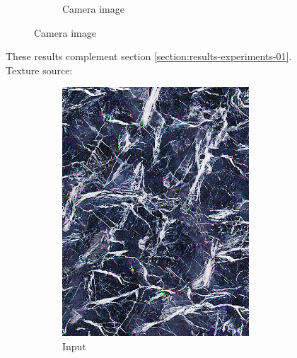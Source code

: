 \begin{figure}[]
\begin{subfigure}{\textwidth}
\begin{subfigure}{0.24\textwidth}
            \caption*{Camera image}
        \end{subfigure}
    \end{subfigure}
    \caption{These results complement section \ref{section:results-experiments-01}. Texture source: \citet{Pixar128}}
    \label{fig:ex01-complete-flowers-1000steps}
\end{figure}

\begin{figure}[]
    \centering    
    \begin{subfigure}{\textwidth}
        \centering
        \begin{subfigure}{0.24\textwidth}
            \centering
            \includegraphics[width=\textwidth]{images/04-experiment02/human/marble/target.jpg}
            \caption*{Input}
        \end{subfigure}
        \hfill
        \begin{subfigure}{0.24\textwidth}

\end{subfigure}
\end{subfigure}
\end{figure}
